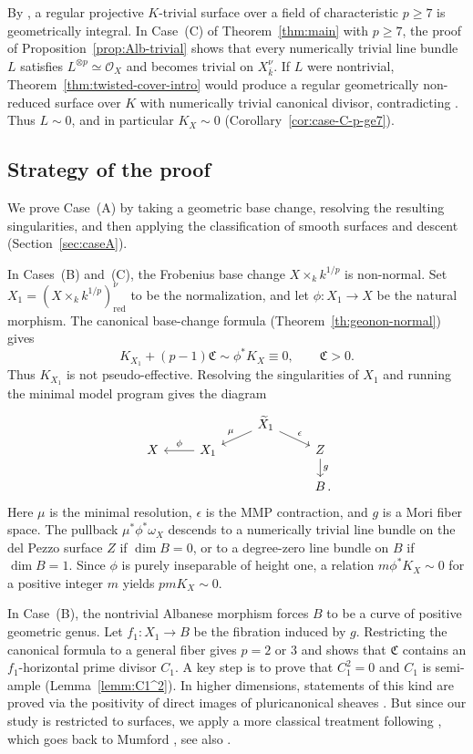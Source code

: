 \documentclass[10pt,abstract=true]{scrartcl}
\numberwithin{equation}{section}
\theoremstyle{definition}
\theoremstyle{remark}
\begin{document}
By \cite[Theorem~1.2]{WZ26}, a regular projective $K$-trivial surface over a field of characteristic $p\ge7$ is geometrically integral.
In Case~\textup{(C)} of Theorem~\ref{thm:main} with $p\ge7$, the proof of Proposition~\ref{prop:Alb-trivial} shows that every numerically trivial line bundle $L$ satisfies $L^{\otimes p}\simeq\mathcal O_X$ and becomes trivial on $X_{\bar k}^\nu$.
If $L$ were nontrivial, Theorem~\ref{thm:twisted-cover-intro} would produce a regular geometrically non-reduced surface over $K$ with numerically trivial canonical divisor, contradicting \cite[Theorem~1.2]{WZ26}.
Thus $L\sim0$, and in particular $K_X\sim0$ (Corollary~\ref{cor:case-C-p-ge7}).



\subsection*{Strategy of the proof}
We prove Case~\textup{(A)} by taking a geometric base change, resolving the resulting singularities, and then applying the classification of smooth surfaces and descent (Section~\ref{sec:caseA}).

In Cases~\textup{(B)} and~\textup{(C)}, the Frobenius base change $X\times_k k^{1/p}$ is non-normal.
Set $X_1 = (X\times_k k^{1/p})_{\mathrm{red}}^\nu$ to be the normalization, and let $\phi\colon X_1\to X$ be the natural morphism.
The canonical base-change formula (Theorem~\ref{th:geonon-normal}) gives
\[
  K_{X_1}+(p-1)\mathfrak C\sim\phi^*K_X\equiv0,
  \qquad \mathfrak C>0.
\]
Thus $K_{X_1}$ is not pseudo-effective.
Resolving the singularities of $X_1$ and running the minimal model program gives the diagram
\[
  \begin{tikzcd}[row sep=tiny]
    && \widetilde X_1 \ar[ld,"\mu"'] \ar[rd,"\epsilon"]\\
    X & X_1 \ar[l,"\phi"'] && Z \ar[d,"g"]\\[2ex]
      &&& B\rlap{\,.}
  \end{tikzcd}
\]
Here $\mu$ is the minimal resolution, $\epsilon$ is the MMP contraction, and $g$ is a Mori fiber space.
The pullback $\mu^*\phi^*\omega_X$ descends to a numerically trivial line bundle on the del Pezzo surface $Z$ if $\dim B = 0$, or to a degree-zero line bundle on $B$ if $\dim B = 1$.
Since $\phi$ is purely inseparable of height one, a relation $m\phi^*K_X\sim0$ for a positive integer $m$ yields $pmK_X\sim0$.

\smallskip
In Case~\textup{(B)}, the nontrivial Albanese morphism forces $B$ to be a curve of positive geometric genus.
Let $f_1\colon X_1\to B$ be the fibration induced by $g$.
Restricting the canonical formula to a general fiber gives $p = 2$ or $3$ and shows that $\mathfrak C$ contains an $f_1$-horizontal prime divisor $C_1$.
A key step is to prove that $C_1^2 = 0$ and $C_1$ is semi-ample (Lemma~\ref{lemm:C1^2}).
In higher dimensions, statements of this kind are proved via the positivity of direct images of pluricanonical sheaves \cite{EP23,Ejiri-2023-splitting,CWZ-classification}.
But since our study is restricted to surfaces, we apply a more classical treatment following \cite[Proposition~3.1]{tanaka_abundance_2020}, which goes back to Mumford \cite[\S2]{Mumford-69-I}, see also \cite[Lemma, p.~682]{Masek-1993}.
\end{document}
